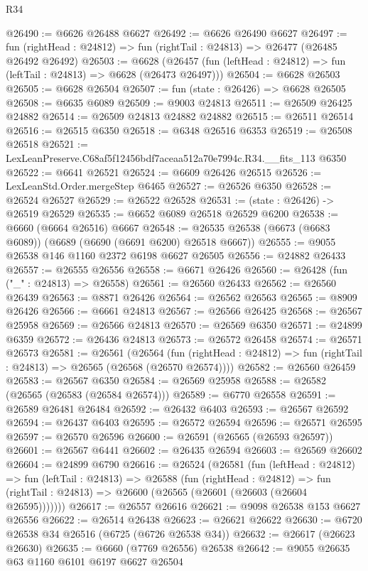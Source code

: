 \begin{lexlean}{R34}
\begin{coremodule}
@26490 := @6626 @26488 @6627
@26492 := @6626 @26490 @6627
@26497 := fun (rightHead : @24812) => fun (rightTail : @24813) => @26477 (@26485 @26492 @26492)
@26503 := @6628
    (@26457 (fun (leftHead : @24812) => fun (leftTail : @24813) => @6628 (@26473 @26497)))
@26504 := @6628 @26503
@26505 := @6628 @26504
@26507 := fun (state : @26426) => @6628 @26505
@26508 := @6635 @6089
@26509 := @9003 @24813
@26511 := @26509 @26425 @24882
@26514 := @26509 @24813 @24882 @24882
@26515 := @26511 @26514
@26516 := @26515 @6350
@26518 := @6348 @26516 @6353
@26519 := @26508 @26518
@26521 := LexLeanPreserve.C68af5f12456bdf7aceaa512a70e7994c.R34.__fits_113 @6350
@26522 := @6641 @26521
@26524 := @6609 @26426 @26515
@26526 := LexLeanStd.Order.mergeStep @6465
@26527 := @26526 @6350
@26528 := @26524 @26527
@26529 := @26522 @26528
@26531 := (state : @26426) -> @26519 @26529
@26535 := @6652 @6089 @26518 @26529 @6200
@26538 := @6660 (@6664 @26516) @6667
@26548 := @26535 @26538 (@6673 (@6683 @6089)) (@6689 (@6690 (@6691 @6200) @26518 @6667))
@26555 := @9055 @26538 @146 @1160 @2372 @6198 @6627 @26505
@26556 := @24882 @26433
@26557 := @26555 @26556
@26558 := @6671 @26426
@26560 := @26428 (fun ("_" : @24813) => @26558)
@26561 := @26560 @26433
@26562 := @26560 @26439
@26563 := @8871 @26426
@26564 := @26562 @26563
@26565 := @8909 @26426
@26566 := @6661 @24813
@26567 := @26566 @26425
@26568 := @26567 @25958
@26569 := @26566 @24813
@26570 := @26569 @6350
@26571 := @24899 @6359
@26572 := @26436 @24813
@26573 := @26572 @26458
@26574 := @26571 @26573
@26581 := @26561
    (@26564
      (fun (rightHead : @24812) => fun (rightTail : @24813) => @26565 (@26568 (@26570 @26574))))
@26582 := @26560 @26459
@26583 := @26567 @6350
@26584 := @26569 @25958
@26588 := @26582 (@26565 (@26583 (@26584 @26574)))
@26589 := @6770 @26558
@26591 := @26589 @26481 @26484
@26592 := @26432 @6403
@26593 := @26567 @26592
@26594 := @26437 @6403
@26595 := @26572 @26594
@26596 := @26571 @26595
@26597 := @26570 @26596
@26600 := @26591 (@26565 (@26593 @26597))
@26601 := @26567 @6441
@26602 := @26435 @26594
@26603 := @26569 @26602
@26604 := @24899 @6790
@26616 := @26524
    (@26581
      (fun (leftHead : @24812) =>
      fun (leftTail : @24813) =>
      @26588
        (fun (rightHead : @24812) =>
        fun (rightTail : @24813) => @26600 (@26565 (@26601 (@26603 (@26604 @26595)))))))
@26617 := @26557 @26616
@26621 := @9098 @26538 @153 @6627 @26556
@26622 := @26514 @26438
@26623 := @26621 @26622
@26630 := @6720 @26538 @34 @26516 (@6725 (@6726 @26538 @34))
@26632 := @26617 (@26623 @26630)
@26635 := @6660 (@7769 @26556) @26538
@26642 := @9055 @26635 @63 @1160 @6101 @6197 @6627 @26504

\end{coremodule}
\end{lexlean}
